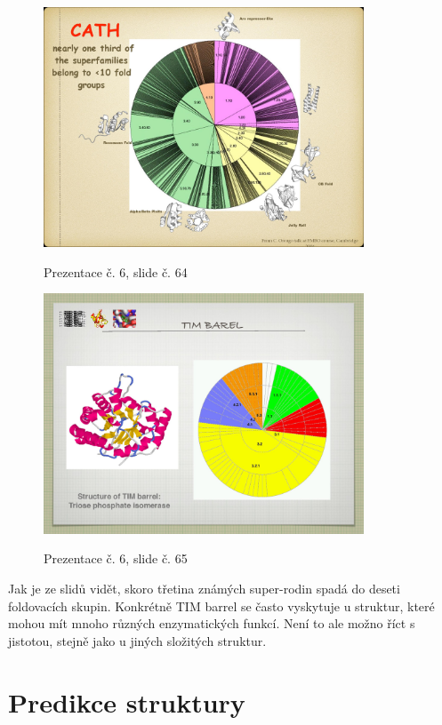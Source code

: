 \documentclass[DIV=8]{scrreprt}
\begin{document}
\begin{figure}
    \caption{Prezentace č. 6, slide č. 64}
    \includegraphics[width=0.85\textwidth]{slides-6/slide-64.jpg}
    \centering
    \label{slides-6-slide-64}
\end{figure}
\begin{figure}
    \caption{Prezentace č. 6, slide č. 65}
    \includegraphics[width=0.85\textwidth]{slides-6/slide-65.jpg}
    \centering
    \label{slides-6-slide-65}
\end{figure}

Jak je ze slidů vidět, skoro třetina známých super-rodin spadá do deseti foldovacích skupin. Konkrétně TIM barrel se často vyskytuje u struktur, které mohou mít mnoho různých enzymatických funkcí. Není to ale možno říct s jistotou, stejně jako u jiných složitých struktur.


\section{Predikce struktury} \label{Predikce struktury}
\end{document}
